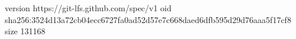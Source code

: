 version https://git-lfs.github.com/spec/v1
oid sha256:3524d13a72cb04ecc6727fa0ad52d57e7c668daed6dfb595d29d76aaa5f17cf8
size 131168
